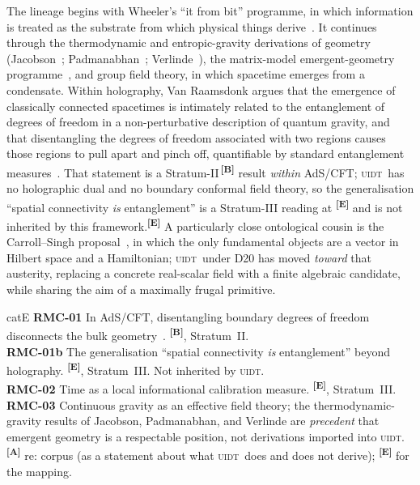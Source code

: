 \documentclass[12pt,a4paper,twoside]{article}
\theoremstyle{plain}
\theoremstyle{definition}
\theoremstyle{remark}
\newcommand{\UIDT}{\textsc{uidt}}
\newcommand{\catmark}[1]{\textsuperscript{\textsf{\textbf{[#1]}}}}
\begin{document}
The lineage begins with Wheeler's ``it from bit'' programme, in which
information is treated as the substrate from which physical things
derive~\cite{wheeler1990}. It continues through the thermodynamic and
entropic-gravity derivations of geometry
(Jacobson~\cite{jacobson1995}; Padmanabhan~\cite{padmanabhan2010};
Verlinde~\cite{verlinde2011}), the matrix-model emergent-geometry
programme~\cite{ikkt1997,steinacker2010}, and group field theory, in
which spacetime emerges from a condensate. Within holography, Van
Raamsdonk argues that the emergence of classically connected spacetimes
is intimately related to the entanglement of degrees of freedom in a
non-perturbative description of quantum gravity, and that disentangling
the degrees of freedom associated with two regions causes those regions
to pull apart and pinch off, quantifiable by standard entanglement
measures~\cite{vanraamsdonk2010}. That statement is a
Stratum-II\,\catmark{B} result \emph{within} AdS/CFT; \UIDT\ has no
holographic dual and no boundary conformal field theory, so the
generalisation ``spatial connectivity \emph{is} entanglement'' is a
Stratum-III reading at \catmark{E} and is not inherited by this
framework.\catmark{E} A particularly close ontological cousin is the
Carroll--Singh proposal~\cite{carrollsingh2018}, in which the only
fundamental objects are a vector in Hilbert space and a Hamiltonian;
\UIDT\ under D20 has moved \emph{toward} that austerity, replacing a
concrete real-scalar field with a finite algebraic candidate, while
sharing the aim of a maximally frugal primitive.

\begin{evidencebox}{catE}
\textbf{RMC-01} In AdS/CFT, disentangling boundary degrees of freedom
disconnects the bulk geometry~\cite{vanraamsdonk2010}. \catmark{B},
Stratum~II.\\[0.25em]
\textbf{RMC-01b} The generalisation ``spatial connectivity \emph{is}
entanglement'' beyond holography. \catmark{E}, Stratum~III. Not inherited
by \UIDT.\\[0.25em]
\textbf{RMC-02} Time as a local informational calibration measure.
\catmark{E}, Stratum~III.\\[0.25em]
\textbf{RMC-03} Continuous gravity as an effective field theory; the
thermodynamic-gravity results of Jacobson, Padmanabhan, and Verlinde are
\emph{precedent} that emergent geometry is a respectable position, not
derivations imported into \UIDT. \catmark{A} re: corpus (as a statement
about what \UIDT\ does and does not derive); \catmark{E} for the mapping.
\end{evidencebox}
\end{document}
